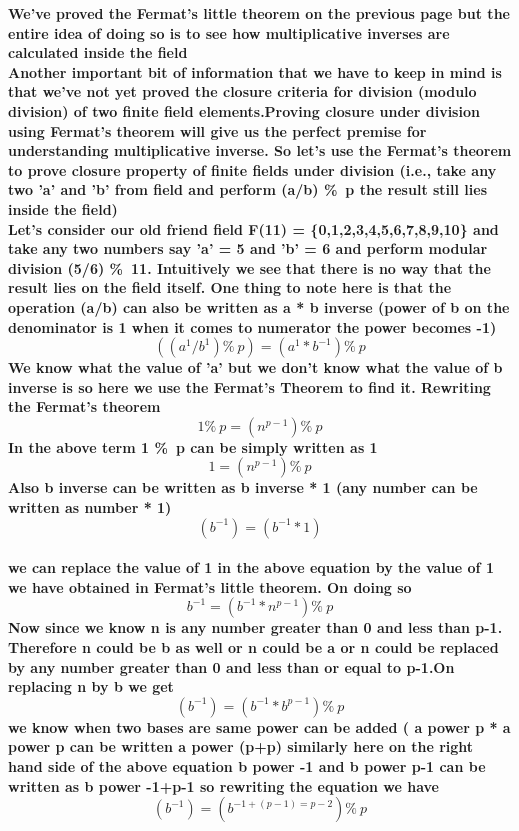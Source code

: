 \documentclass{article}
\begin{document}
\pagebreak
\textbf{We've proved the Fermat's little theorem on the previous page but the entire idea  of doing so is to see how multiplicative inverses are calculated inside the field 
\\
Another important bit of information that we have to keep in mind is that we've not yet proved the closure criteria for division (modulo division) of two finite field elements.Proving closure under division using Fermat's theorem will give us the perfect premise for understanding multiplicative inverse. So let's use the Fermat's theorem to prove closure property of finite fields under division (i.e., take any two 'a' and 'b' from field and perform (a/b) \%\ p the result still lies inside the field)}
\\
\textbf{Let's consider our old friend field F(11) = \{0,1,2,3,4,5,6,7,8,9,10\} and take any two numbers say 'a' = 5 and 'b' = 6 and perform modular division (5/6) \%\ 11. Intuitively we see that there is no way that the result lies on the field itself. One thing to note here is that the operation (a/b) can also be written as a * b inverse (power of b on the denominator is 1 when it comes to numerator the power becomes -1)}
\textbf{\[((a^{1}/b^{1})\%\ p) = (a^{1}* b ^{-1}) \%\ p \]}
\textbf{We know what the value of 'a'   but we don't know what the value of b inverse  is so here we use the Fermat's Theorem to find it. Rewriting the Fermat's theorem  }
\\
\textbf{\[ 1 \%\ p = (n ^{p-1}) \%\ p \]}
\textbf{ In the above term 1 \%\ p can be simply written as 1 }
\textbf{\[ 1  = (n ^{p-1}) \%\ p \]}
\textbf{Also b inverse can be written as b inverse * 1 (any number can be written as number * 1)}
\textbf{\[ (b^{-1}) =  (b^{-1} *1)  \]}
\\
\textbf{we can replace the value of 1 in the above equation by the value of 1 we have obtained in Fermat's little theorem. On doing so  }
\textbf{ \[ b^{-1} =(b^{-1} *  n ^{p-1})  \%\ p \] }
\textbf{Now since we know n is any number greater than 0 and less than p-1. Therefore  n could be b  as well or n could be a or  n could be replaced by any number greater than 0 and less than or equal to p-1.On replacing n by b we get }
\pagebreak
\textbf {\[ (b^{-1}) = (b^{-1} * b^{p-1}) \%\ p \]  }
\textbf{we know when two bases are same power can be added ( a power p * a power p can be written a  power (p+p) similarly  here on the right hand side of the above equation  b power -1 and b power p-1 can be written as b power -1+p-1 so rewriting the equation we have }
\textbf {\[ (b^{-1}) = (b ^{-1 + (p-1) = p-2}) \%\ p \]}
\end{document}
